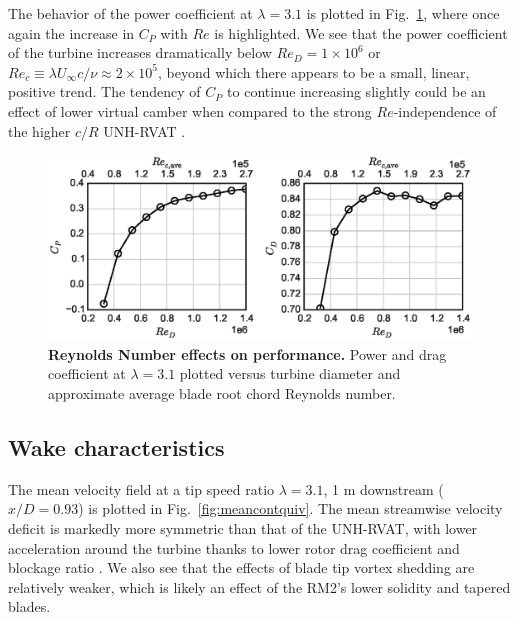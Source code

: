 \documentclass[10pt,letterpaper]{article}
\begin{document}
The behavior of the power coefficient at $\lambda=3.1$ is plotted in
Fig.~\ref{fig:cp-re-dep}, where once again the increase in $C_P$ with $Re$ is
highlighted. We see that the power coefficient of the turbine increases
dramatically below $Re_D = 1 \times 10^6$ or $Re_c \equiv \lambda U_\infty c /
\nu \approx 2 \times 10^5$, beyond which there appears to be a small, linear,
positive trend. The tendency of $C_P$ to continue increasing slightly could be
an effect of lower virtual camber when compared to the strong $Re$-independence
of the higher $c/R$ UNH-RVAT \cite{Bachant2015-RVAT-Re-dep}.

\begin{figure}[h]
    \includegraphics[width=\textwidth]{figures/perf_re_dep.eps}

    \caption{{\bf Reynolds Number effects on performance.} Power and drag
    coefficient at $\lambda=3.1$ plotted versus turbine diameter and approximate
    average blade root chord Reynolds number.}

    \label{fig:cp-re-dep}
\end{figure}


\subsection*{Wake characteristics}

The mean velocity field at a tip speed ratio $\lambda=3.1$, 1 m downstream
($x/D=0.93$) is plotted in Fig.~\ref{fig:meancontquiv}. The mean streamwise
velocity deficit is markedly more symmetric than that of the UNH-RVAT, with
lower acceleration around the turbine thanks to lower rotor drag coefficient and
blockage ratio \cite{Bachant2015-JoT}. We also see that the effects of blade tip
vortex shedding are relatively weaker, which is likely an effect of the RM2's
lower solidity and tapered blades.
\end{document}
